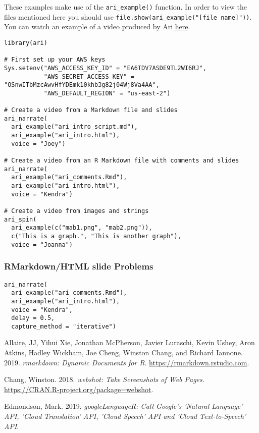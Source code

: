 These examples make use of the \texttt{ari\_example()} function. In
order to view the files mentioned here you should use
\texttt{file.show(ari\_example("{[}file\ name{]}"))}. You can watch an
example of a video produced by Ari
\href{https://youtu.be/dcIUu4GCOKU}{here}.

\begin{verbatim}
library(ari)

# First set up your AWS keys
Sys.setenv("AWS_ACCESS_KEY_ID" = "EA6TDV7ASDE9TL2WI6RJ",
           "AWS_SECRET_ACCESS_KEY" = "OSnwITbMzcAwvHfYDEmk10khb3g82j04Wj8Va4AA",
           "AWS_DEFAULT_REGION" = "us-east-2")

# Create a video from a Markdown file and slides
ari_narrate(
  ari_example("ari_intro_script.md"),
  ari_example("ari_intro.html"),
  voice = "Joey")

# Create a video from an R Markdown file with comments and slides
ari_narrate(
  ari_example("ari_comments.Rmd"),
  ari_example("ari_intro.html"),
  voice = "Kendra")

# Create a video from images and strings
ari_spin(
  ari_example(c("mab1.png", "mab2.png")),
  c("This is a graph.", "This is another graph"),
  voice = "Joanna")
\end{verbatim}

\hypertarget{rmarkdownhtml-slide-problems}{%
\subsubsection{RMarkdown/HTML slide
Problems}\label{rmarkdownhtml-slide-problems}}

\begin{verbatim}
ari_narrate(
  ari_example("ari_comments.Rmd"),
  ari_example("ari_intro.html"),
  voice = "Kendra",
  delay = 0.5,
  capture_method = "iterative")
\end{verbatim}



\hypertarget{refs}{}
\leavevmode\hypertarget{ref-rmarkdown}{}%
Allaire, JJ, Yihui Xie, Jonathan McPherson, Javier Luraschi, Kevin
Ushey, Aron Atkins, Hadley Wickham, Joe Cheng, Winston Chang, and
Richard Iannone. 2019. \emph{rmarkdown: Dynamic Documents for R}.
\url{https://rmarkdown.rstudio.com}.

\leavevmode\hypertarget{ref-webshot}{}%
Chang, Winston. 2018. \emph{webshot: Take Screenshots of Web Pages}.
\url{https://CRAN.R-project.org/package=webshot}.

\leavevmode\hypertarget{ref-googleLanguageR}{}%
Edmondson, Mark. 2019. \emph{googleLanguageR: Call Google's 'Natural
Language' API, 'Cloud Translation' API, 'Cloud Speech' API and 'Cloud
Text-to-Speech' API}.

